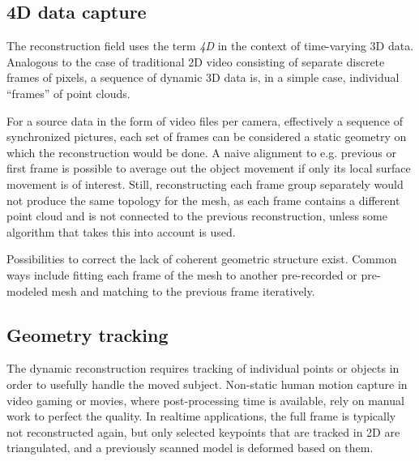

\subsection{4D data capture} %

The reconstruction field uses the term \emph{4D} in the context of time-varying 3D data.
Analogous to the case of traditional 2D video consisting of separate discrete frames of pixels, a sequence of dynamic 3D data is, in a simple case, individual ``frames'' of point clouds.

For a source data in the form of video files per camera, effectively a sequence of synchronized pictures, each set of frames can be considered a static geometry on which the reconstruction would be done.
A naive alignment to e.g. previous or first frame is possible to average out the object movement if only its local surface movement is of interest.
Still, reconstructing each frame group separately would not produce the same topology for the mesh, as each frame contains a different point cloud and is not connected to the previous reconstruction, unless some algorithm that takes this into account is used.

Possibilities to correct the lack of coherent geometric structure exist.
Common ways include fitting each frame of the mesh to another pre-recorded or pre-modeled mesh \cite{somewhere,remedysoftware?} and matching to the previous frame iteratively.


\subsection{Geometry tracking} %


The dynamic reconstruction requires tracking of individual points or objects in order to usefully handle the moved subject.
Non-static human motion capture in video gaming or movies, where post-processing time is available, rely on manual work to perfect the quality.
In realtime applications, the full frame is typically not reconstructed again, but only selected keypoints that are tracked in 2D are triangulated, and a previously scanned model is deformed based on them.

